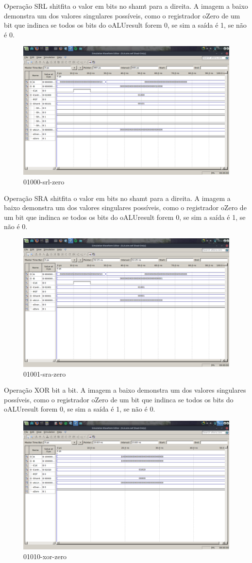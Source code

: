 \documentclass[12pt]{article}
\begin{document}
Operação SRL shitfita o valor em bits no shamt para a direita.  
A imagem a baixo demonstra um dos valores singulares possíveis, como o registrador oZero de um bit que indinca se todos os bits do oALUresult forem 0, se sim a saída é 1, se não é 0.
\begin{figure}[H]
	\centering
	\includegraphics[width=.8\textwidth]{01000-srl-zero.png}
	\caption{01000-srl-zero}
	\label{fig:01000-srl-zero}
\end{figure}
Operação SRA shitfita o valor em bits no shamt para a direita.  
A imagem a baixo demonstra um dos valores singulares possíveis, como o registrador oZero de um bit que indinca se todos os bits do oALUresult forem 0, se sim a saída é 1, se não é 0.
\begin{figure}[H]
	\centering
	\includegraphics[width=.8\textwidth]{01001-sra-zero.png}
	\caption{01001-sra-zero}
	\label{fig:01001-sra-zero}
\end{figure}
Operação XOR bit a bit.  
A imagem a baixo demonstra um dos valores singulares possíveis, como o registrador oZero de um bit que indinca se todos os bits do oALUresult forem 0, se sim a saída é 1, se não é 0.
\begin{figure}[H]
	\centering
	\includegraphics[width=.8\textwidth]{01010-xor-zero.png}
	\caption{01010-xor-zero}
	\label{fig:01010-xor-zero}
\end{figure}
\end{document}
